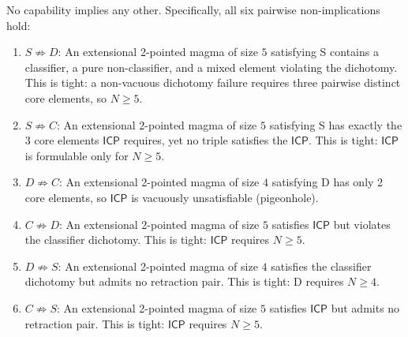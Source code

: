 \documentclass[sigconf,screen]{acmart}
\newcommand{\ICP}{\textsf{ICP}}
\theoremstyle{remark}
\begin{document}
\begin{theorem}
\label{thm:independence}
No capability implies any other. Specifically, all six pairwise non-implications hold:
\begin{enumerate}
  \item $S \not\Rightarrow D$: An extensional 2-pointed magma of size $5$ satisfying S contains a classifier, a pure non-classifier, and a mixed element violating the dichotomy. This is tight: a non-vacuous dichotomy failure requires three pairwise distinct core elements, so $N \geq 5$.
  \item $S \not\Rightarrow C$: An extensional 2-pointed magma of size $5$ satisfying S has exactly the 3 core elements $\ICP$ requires, yet no triple satisfies the $\ICP$. This is tight: $\ICP$ is formulable only for $N \geq 5$.
  \item $D \not\Rightarrow C$: An extensional 2-pointed magma of size $4$ satisfying D has only 2 core elements, so $\ICP$ is vacuously unsatisfiable (pigeonhole).
  \item $C \not\Rightarrow D$: An extensional 2-pointed magma of size $5$ satisfies $\ICP$ but violates the classifier dichotomy. This is tight: $\ICP$ requires $N \geq 5$.
  \item $D \not\Rightarrow S$: An extensional 2-pointed magma of size $4$ satisfies the classifier dichotomy but admits no retraction pair. This is tight: D requires $N \geq 4$.
  \item $C \not\Rightarrow S$: An extensional 2-pointed magma of size $5$ satisfies $\ICP$ but admits no retraction pair. This is tight: $\ICP$ requires $N \geq 5$.
\end{enumerate}
\end{theorem}
\end{document}
